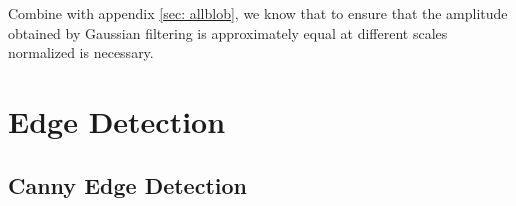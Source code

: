 \documentclass[final]{cvpr}
\begin{document}
Combine with appendix \ref{sec: allblob}, we know that to ensure that the amplitude obtained by Gaussian filtering is approximately equal at different scales normalized is necessary.  


\clearpage

\onecolumn

\begin{appendices}\label{append}

\section{Edge Detection}\label{sec: allcanny}

\subsection{Canny Edge Detection}


\end{appendices}
\end{document}
